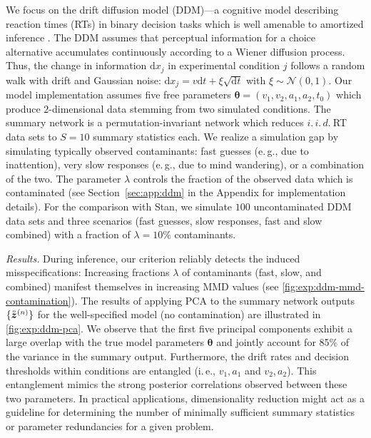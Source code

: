 \documentclass[twoside,11pt]{article}
\newcommand{\observed}[1]{\protect\accentset{\text{o}}{#1}}%
\newcommand{\z}{\boldsymbol{z}}
\newcommand{\thetab}{\boldsymbol{\theta}}
\newcommand{\0}{\boldsymbol{0}}
\newcommand{\diff}{\mathrm{d}}
\newcommand{\ie}{i.\,e.}
\newcommand{\eg}{e.\,g.}
\renewcommand{\cite}[1]{\citep{#1}}
\begin{document}
We focus on the drift diffusion model (DDM)---a cognitive model describing reaction times (RTs) in binary decision tasks \cite{Ratcliff2008} which is well amenable to amortized inference \cite{Radev2020bayesflow-cognition}.
The DDM assumes that perceptual information for a choice alternative accumulates continuously according to a Wiener diffusion process. 
Thus, the change in information $\diff x_j$ in experimental condition $j$ follows a random walk with drift and Gaussian noise: $\mathrm{d}x_j = v\mathrm{d}t + \xi \sqrt{\mathrm{d}t}$ with $\xi\sim\mathcal{N}(0, 1)$.
Our model implementation assumes five free parameters $\thetab = (v_1, v_2, a_1, a_2, t_0)$ which produce $2$-dimensional data stemming from two simulated conditions.
The summary network is a permutation-invariant network which reduces $i.\,i.\,d.\ $RT data sets to $S=10$ summary statistics each.
We realize a simulation gap by simulating typically observed contaminants: fast guesses (\eg, due to inattention), very slow responses (\eg, due to mind wandering), or a combination of the two.
The parameter $\lambda$ controls the fraction of the observed data which is contaminated  (see Section~\ref{sec:app:ddm} in the Appendix for implementation details).
For the comparison with Stan, we simulate $100$ uncontaminated DDM data sets and three scenarios (fast guesses, slow responses, fast and slow combined) with a fraction of $\lambda = 10\%$ contaminants.

\textit{Results.} During inference, our criterion reliably detects the induced misspecifications: Increasing fractions $\lambda$ of contaminants (fast, slow, and combined) manifest themselves in increasing MMD values (see \autoref{fig:exp:ddm-mmd-contamination}).
The results of applying PCA to the summary network outputs $\{\observed{\z}^{(n)}\}$ for the well-specified model (no contamination) are illustrated in \autoref{fig:exp:ddm-pca}.
We observe that the first five principal components exhibit a large overlap with the true model parameters $\thetab$ and jointly account for 85\% of the variance in the summary output.
Furthermore, the drift rates and decision thresholds within conditions are entangled (\ie, $v_1, a_1$ and $v_2, a_2$).
This entanglement mimics the strong posterior correlations observed between these two parameters.
In practical applications, dimensionality reduction might act as a guideline for determining the number of minimally sufficient summary statistics or parameter redundancies for a given problem.
\end{document}
